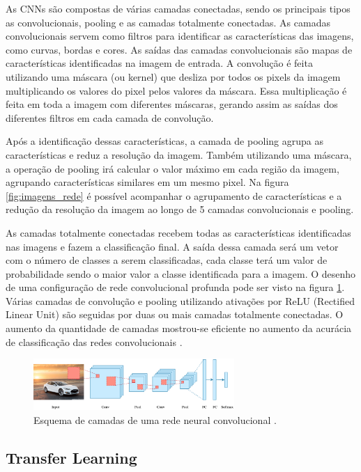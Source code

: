 \documentclass[conference]{IEEEtran}
\begin{document}
As CNNs são compostas de várias camadas conectadas, sendo os principais tipos as convolucionais, pooling e as camadas totalmente conectadas. As camadas convolucionais servem como filtros para identificar as características das imagens, como curvas, bordas e cores. As saídas das camadas convolucionais são mapas de características identificadas na imagem de entrada. A convolução é feita utilizando uma máscara (ou kernel) que desliza por todos os pixels da imagem multiplicando os valores do pixel pelos valores da máscara. Essa multiplicação é feita em toda a imagem com diferentes máscaras, gerando assim as saídas dos diferentes filtros em cada camada de convolução.

Após a identificação dessas características, a camada de pooling agrupa as características e reduz a resolução da imagem. Também utilizando uma máscara, a operação de pooling irá calcular o valor máximo em cada região da imagem, agrupando características similares em um mesmo pixel. Na figura \ref{fig:imagens_rede} é possível acompanhar o agrupamento de características e a redução da resolução da imagem ao longo de 5 camadas convolucionais e pooling.

As camadas totalmente conectadas recebem todas as características identificadas nas imagens e fazem a classificação final. A saída dessa camada será um vetor com o número de classes a serem classificadas, cada classe terá um valor de probabilidade sendo o maior valor a classe identificada para a imagem. O desenho de uma configuração de rede convolucional profunda pode ser visto na figura \ref{fig:convolucao}. Várias camadas de convolução e pooling utilizando ativações por ReLU (Rectified Linear Unit) são seguidas por duas ou mais camadas totalmente conectadas. O aumento da quantidade de camadas mostrou-se eficiente no aumento da acurácia de classificação das redes convolucionais \cite{simonyan2014}.


\begin{figure}[!tp]
 \centering
 \includegraphics[width=3in]{img/convolucao.png}
 \caption{Esquema de camadas de uma rede neural convolucional \cite{convTDS}.}
 \label{fig:convolucao}
\end{figure}


  \subsection{Transfer Learning}
\end{document}
